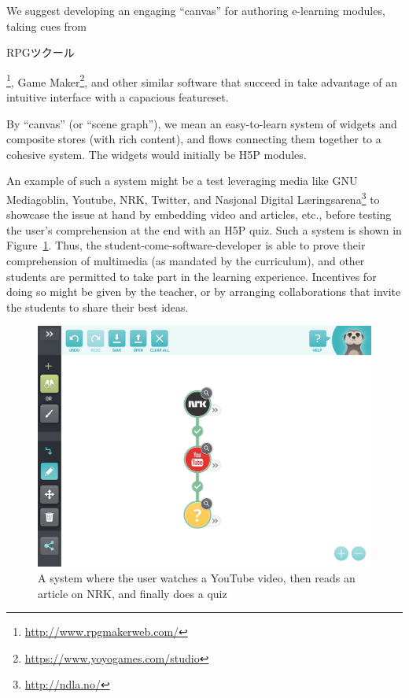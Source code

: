 We suggest developing an engaging ``canvas''  for authoring e-learning 
modules, taking cues from 
\begin{CJK}{UTF8}{min}RPGツクール\end{CJK}\footnote{\url{http://www.rpgmakerweb.com/}}, 
Game Maker\footnote{\url{https://www.yoyogames.com/studio}}, and other similar 
software that succeed in take advantage of an intuitive interface with a 
capacious featureset.

By ``canvas'' (or ``scene graph''), we mean an easy-to-learn system of widgets 
and composite stores (with rich content), and flows connecting them together 
to a cohesive system. The widgets would initially be H5P modules.

An example of such a system might be a test leveraging media like GNU 
Mediagoblin, Youtube, NRK, Twitter, and Nasjonal Digital 
Læringsarena\footnote{\url{http://ndla.no/}} to showcase the issue at hand by 
embedding video and articles, etc., before testing the user's comprehension at 
the end with an H5P quiz. Such a system is shown in 
Figure~\ref{fig:younrkquiz}. Thus, the student-come-software-developer is able 
to prove their comprehension of multimedia (as mandated by the curriculum), 
and other students are permitted to take part in the learning experience.
Incentives for doing so might be given by the teacher, or by arranging 
collaborations that invite the students to share their best ideas.

\begin{figure}[H]
    \centering
    \begin{scale}{0.1}
        \includegraphics{fig/younrkquiz.png}
    \end{scale}
    \caption{A system where the user watches a YouTube video, then reads an 
   article on NRK, and finally does a quiz}
\label{fig:younrkquiz}
\end{figure}

